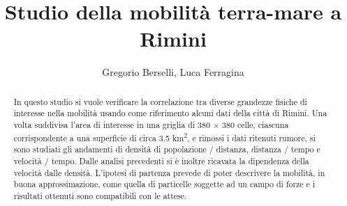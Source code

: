\documentclass[12pt,a4paper]{article}
\begin{document}
\title{\textbf{Studio della mobilità terra-mare a Rimini}}
\author{Gregorio Berselli, Luca Ferragina}
\date{}
\maketitle

\begin{abstract}
In questo studio si vuole verificare la correlazione tra diverse grandezze fisiche di interesse nella mobilità usando come riferimento alcuni dati della città di Rimini.
Una volta suddivisa l'area di interesse in una griglia di 380 $\times$ 380 celle, ciascuna corrispondente a una superficie di circa 3.5 km\textsuperscript{2}, e rimossi i dati ritenuti rumore, si sono studiati gli andamenti di densità di popolazione / distanza, distanza / tempo e velocità / tempo.
Dalle analisi precedenti si è inoltre ricavata la dipendenza della velocità dalle densità.
L'ipotesi di partenza prevede di poter descrivere la mobilità, in buona approssimazione, come quella di particelle soggette ad un campo di forze e i risultati ottenuti sono compatibili con le attese.
\end{abstract}
\end{document}
